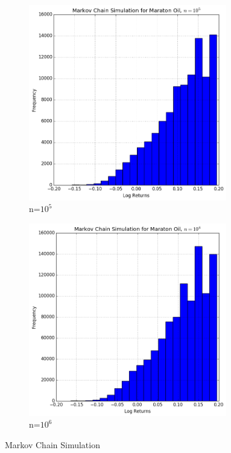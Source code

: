 \documentclass[a4paper,12pt]{article}
\theoremstyle{definition}
\begin{document}
\begin{figure}[h]
\centering
\begin{subfigure}{.5\textwidth}
  \centering
  \includegraphics[width=0.95\textwidth]{mcLogReturns_5.png} 
  \caption{n=$10^5$}
  \label{fig:MCSim5_2}
\end{subfigure}%
\begin{subfigure}{.5\textwidth}
  \centering
  \includegraphics[width=0.95\textwidth]{mcLogReturns_6.png} 
  \caption{n=$10^6$}
  \label{fig:MCSim6}
\end{subfigure}
\caption{Markov Chain Simulation}
\label{fig:DiscreteMCSim2}
\end{figure}
\end{document}

